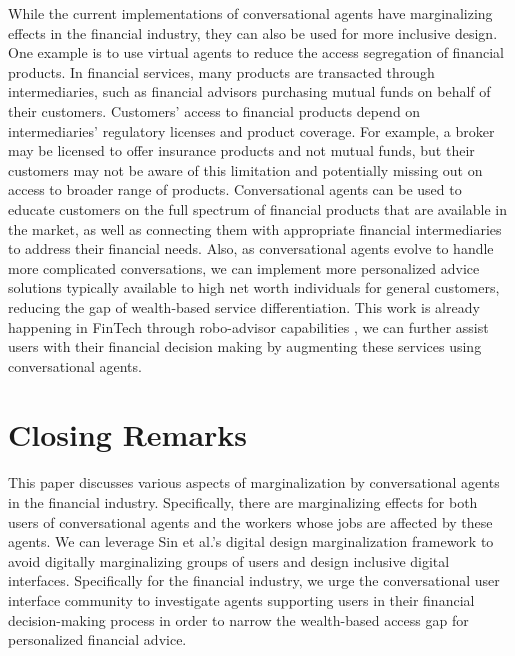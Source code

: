 \documentclass{sigchi-ext}
\begin{document}
While the current implementations of conversational agents have marginalizing effects in the financial industry, they can also be used for more inclusive design. One example is to use virtual agents to reduce the access segregation of financial products. In financial services, many products are transacted through intermediaries, such as financial advisors purchasing mutual funds on behalf of their customers. Customers' access to financial products depend on intermediaries' regulatory licenses and product coverage. For example, a broker may be licensed to offer insurance products and not mutual funds, but their customers may not be aware of this limitation and potentially missing out on access to broader range of products. Conversational agents can be used to educate customers on the full spectrum of financial products that are available in the market, as well as connecting them with appropriate financial intermediaries to address their financial needs. Also, as conversational agents evolve to handle more complicated conversations, we can implement more personalized advice solutions typically available to high net worth individuals for general customers, reducing the gap of wealth-based service differentiation. This work is already happening in FinTech through robo-advisor capabilities \cite{philippon2019fintech}, we can further assist users with their financial decision making by augmenting these services using conversational agents. 


\section{Closing Remarks}

This paper discusses various aspects of marginalization by conversational agents in the financial industry. Specifically, there are marginalizing effects for both users of conversational agents and the workers whose jobs are affected by these agents. We can leverage Sin et al.\cite{sin2021digital}'s digital design marginalization framework to avoid digitally marginalizing groups of users and design inclusive digital interfaces. Specifically for the financial industry, we urge the conversational user interface community to investigate agents supporting users in their financial decision-making process in order to narrow the wealth-based access gap for personalized financial advice.

\balance{} 



\end{document}
